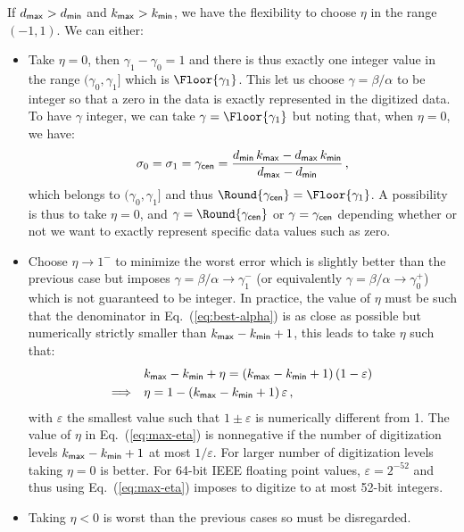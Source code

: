 \documentclass[]{article}
\begin{document}
If $d_{\mathsf{max}} > d_{\mathsf{min}}$ and $k_{\mathsf{max}} > k_{\mathsf{min}}$, we have the
flexibility to choose $\eta$ in the range $(-1,1)$.   We can either:
\begin{itemize}
\item Take $\eta = 0$, then $\gamma_1 - \gamma_0 = 1$ and there is thus exactly
one integer value in the range  $(\gamma_0,\gamma_1]$ which is
$\Floor{\gamma_1}$.  This let us choose $\gamma=\beta/\alpha$ to be integer so
that a zero in the data is exactly represented in the digitized data.  To have
$\gamma$ integer, we can take $\gamma = \Floor{\gamma_1}$ but noting that, when
$\eta=0$, we have:
\begin{equation}
	\sigma_0 = \sigma_1 = \gamma_{\mathsf{cen}}
	= \frac{d_{\mathsf{min}}\,k_{\mathsf{max}} - d_{\mathsf{max}}\,k_{\mathsf{min}}}
	       {d_{\mathsf{max}} - d_{\mathsf{min}}} \, ,
	       \label{eq:gamma-center}
\end{equation}
which belongs to $(\gamma_0,\gamma_1]$ and thus $\Round{\gamma_\Tag{cen}} =
\Floor{\gamma_1}$.  A possibility is thus to take $\eta=0$, and $\gamma =
\Round{\gamma_\Tag{cen}}$ or $\gamma = \gamma_{\mathsf{cen}}$ depending whether or
not we want to exactly represent specific data values such as zero.

\item Choose $\eta \rightarrow 1^-$ to minimize the worst error which is
slightly better than the previous case but imposes $\gamma = \beta/\alpha
\rightarrow \gamma_1^-$ (or equivalently $\gamma = \beta/\alpha \rightarrow
\gamma_0^+$) which is not guaranteed to be integer.  In practice, the value of
$\eta$ must be such that the denominator in Eq.~(\ref{eq:best-alpha}) is as
close as possible but numerically strictly smaller than $k_{\mathsf{max}} -
k_{\mathsf{min}} + 1$, this leads to take $\eta$ such that:
\begin{align}
  &k_{\mathsf{max}} - k_{\mathsf{min}} + \eta
  = (k_{\mathsf{max}} - k_{\mathsf{min}} + 1)\,(1 - \varepsilon) \notag \\
  \Longrightarrow\quad& \eta = 1 - (k_{\mathsf{max}} - k_{\mathsf{min}} + 1)\,\varepsilon \, ,
  \label{eq:max-eta}
\end{align}
with $\varepsilon$ the smallest value such that $1\pm\varepsilon$ is
numerically different from 1.  The value of $\eta$ in Eq.~(\ref{eq:max-eta}) is
nonnegative if the number of digitization levels $k_{\mathsf{max}} - k_{\mathsf{min}} +
1$ at most $1/\varepsilon$.  For larger number of digitization levels taking
$\eta=0$ is better.  For 64-bit IEEE floating point values, $\varepsilon =
2^{-52}$ and thus using Eq.~(\ref{eq:max-eta}) imposes to digitize to at most
52-bit integers.

\item Taking $\eta < 0$ is worst than the previous cases so must be
disregarded.
\end{itemize}
\end{document}
